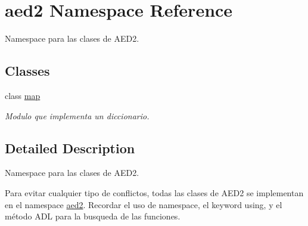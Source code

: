 \hypertarget{namespaceaed2}{}\section{aed2 Namespace Reference}
\label{namespaceaed2}


Namespace para las clases de A\+E\+D2.  


\subsection*{Classes}
\begin{DoxyCompactItemize}
\item 
class \hyperlink{classaed2_1_1map}{map}
\begin{DoxyCompactList}\small\item\em Modulo que implementa un diccionario. \end{DoxyCompactList}\end{DoxyCompactItemize}


\subsection{Detailed Description}
Namespace para las clases de A\+E\+D2. 

Para evitar cualquier tipo de conflictos, todas las clases de A\+E\+D2 se implementan en el namespace \hyperlink{namespaceaed2}{aed2}. Recordar el uso de {\ttfamily namespace}, el keyword {\ttfamily using}, y el método A\+DL para la busqueda de las funciones. 